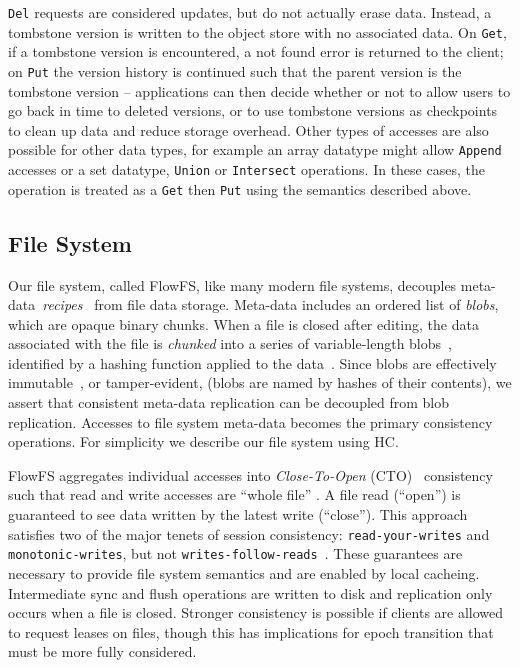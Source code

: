 \texttt{Del} requests are considered updates, but do not actually erase data.
Instead, a tombstone version is written to the object store with no associated data.
On \texttt{Get}, if a tombstone version is encountered, a not found error is returned to the client; on \texttt{Put} the version history is continued such that the parent version is the tombstone version -- applications can then decide whether or not to allow users to go back in time to deleted versions, or to use tombstone versions as checkpoints to clean up data and reduce storage overhead.
Other types of accesses are also possible for other data types, for example an array datatype might allow \texttt{Append} accesses or a set datatype,  \texttt{Union} or \texttt{Intersect} operations.
In these cases, the operation is treated as a \texttt{Get} then \texttt{Put} using the semantics described above.


\subsection{File System}
\label{ch05_file_system}

Our file system, called FlowFS, like many modern file systems, decouples meta-data~\emph{recipes}~\cite{casper,gfs,hadoop_hdfs,pvfs,globalfs} from file data storage.
Meta-data includes an ordered list of \emph{blobs}, which are opaque binary chunks.
When a file is closed after editing, the data associated with the file is \emph{chunked} into a series of variable-length blobs~\cite{lbfs}, identified by a hashing function applied to the data~\cite{rabin_karp,rabin_fingerprint}.
Since blobs are effectively immutable~\cite{immutability_changes_everything}, or tamper-evident, (blobs are named by hashes of their contents), we assert that consistent meta-data replication can be decoupled from blob replication.
Accesses to file system meta-data becomes the primary consistency operations.
For simplicity we describe our file system using HC.

FlowFS aggregates individual accesses into \textit{Close-To-Open} (CTO)~\cite{afs,coda,orifs,sundr,globalfs} consistency such that read and write accesses are ``whole file'' \cite{lbfs}.
A file read (``open'') is guaranteed to see data written by the latest write (``close'').
This approach satisfies two of the major tenets of session consistency: \texttt{read-your-writes} and \texttt{monotonic-writes}, but not \texttt{writes-follow-reads}~\cite{bermbach_consistency_2013,anti_entropy,eventual_consistency}.
These guarantees are necessary to provide file system semantics and are enabled by local cacheing.
Intermediate sync and flush operations are written to disk and replication only occurs when a file is closed.
Stronger consistency is possible if clients are allowed to request leases on files, though this has implications for epoch transition that must be more fully considered.

